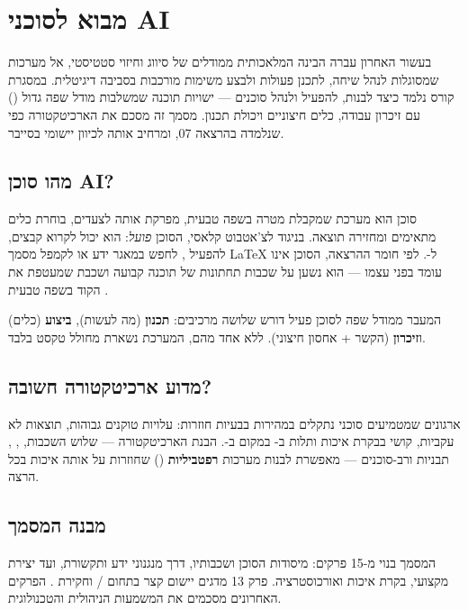 \section{מבוא לסוכני AI}

בעשור האחרון עברה הבינה המלאכותית ממודלים של סיווג וחיזוי סטטיסטי, אל מערכות
שמסוגלות לנהל שיחה, לתכנן פעולות ולבצע משימות מורכבות בסביבה דיגיטלית.
במסגרת קורס  נלמד כיצד לבנות, להפעיל ולנהל סוכנים --- ישויות
תוכנה שמשלבות מודל שפה גדול () עם זיכרון עבודה, כלים חיצוניים ויכולת
תכנון. מסמך זה מסכם את הארכיטקטורה כפי שנלמדה בהרצאה 07, ומרחיב אותה לכיוון
יישומי בסייבר.

\subsection{מהו סוכן AI?}

סוכן  הוא מערכת שמקבלת מטרה בשפה טבעית, מפרקת אותה לצעדים, בוחרת כלים
מתאימים ומחזירה תוצאה. בניגוד לצ'אטבוט קלאסי, הסוכן \emph{פועל}: הוא יכול
לקרוא קבצים, להפעיל , לחפש במאגר ידע או לקמפל מסמך \LaTeX{} ל-.
לפי חומר ההרצאה, הסוכן אינו עומד בפני עצמו --- הוא נשען על שכבות תחתונות של
תוכנה קבועה ושכבת  שמעטפת את הקוד בשפה טבעית \cite{brown2020gpt3}.

\begin{insightbox}
המעבר ממודל שפה לסוכן פעיל דורש שלושה מרכיבים: \textbf{תכנון} (מה לעשות),
\textbf{ביצוע} (כלים) ו\textbf{זיכרון} (הקשר + אחסון חיצוני). ללא אחד מהם,
המערכת נשארת מחולל טקסט בלבד.
\end{insightbox}

\subsection{מדוע ארכיטקטורה חשובה?}

ארגונים שמטמיעים סוכני  נתקלים במהירות בבעיות חוזרות: עלויות טוקנים
גבוהות, תוצאות לא עקביות, קושי בבקרת איכות ותלות ב- במקום ב-.
הבנת הארכיטקטורה --- שלוש השכבות, , , תבניות 
ורב-סוכנים --- מאפשרת לבנות מערכות \textbf{רפטביליות} ()
שחוזרות על אותה איכות בכל הרצה.

\subsection{מבנה המסמך}

המסמך בנוי מ-15 פרקים: מיסודות הסוכן ושכבותיו, דרך מנגנוני ידע ותקשורת,
ועד יצירת  מקצועי, בקרת איכות ואורכוסטרציה. פרק 13 מדגים יישום
קצר בתחום / וחקירת . הפרקים האחרונים
מסכמים את המשמעות הניהולית והטכנולוגית.

